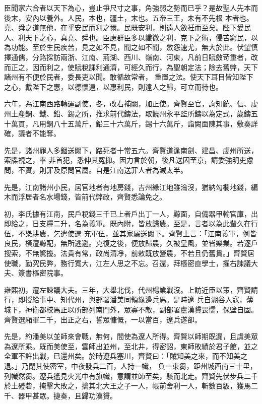 \begin{pinyinscope}
 臣聞家六合者以天下為心，豈止爭尺寸之事，角強弱之勢而已乎？是故聖人先本而後末，安內以養外。人民，本也，疆土，末也。五帝三王，未有不先根
 本者也。堯、舜之道無他，在乎安民而利之爾。民既安利，則遠人斂衽而至矣。陛下愛民人、利天下之心，真堯、舜也。臣慮群臣多以纖微之利，克下之術，侵苦窮民，以為功能。至於生民疾苦，見之如不見，聞之如不聞，斂怨速尤，無大於此。伏望慎擇通儒，分路採訪兩浙、江南、荊湖、西川、嶺南、河東，凡前日賦斂苛重者，改而正之，因而利之，使賦稅課利通濟，可經久而行，為聖朝定法；除去舊弊，天下諸州有不便於民者，委長吏以聞。敢循故常者，
 重置之法。使天下耳目皆知陛下之心，戴陛下之惠，以德懷遠，以惠利民，則遠人之歸，可立而待也。



 六年，為江南西路轉運副使，冬，改右補闕，加正使。齊賢至官，詢知饒、信、虔州土產銅、鐵、鉛、錫之所，推求前代鑄法，取饒州永平監所鑄以為定式，歲鑄五十萬貫，凡用銅八十五萬斤，鉛三十六萬斤，錫十六萬斤，詣闕面陳其事，敷奏詳確，議者不能奪。



 先是，諸州罪人多錮送闕下，路死者十常五六。齊賢道逢南劍、建昌、虔州所送，索牒視之，率
 非首犯，悉伸其冤抑。因力言於朝，後凡送囚至京，請委強明吏慮問，不實，則罪及原問官屬。自是江南送罪人者為減太半。



 先是，江南諸州小民，居官地者有地房錢，吉州緣江地雖淪沒，猶納勾欄地錢，編木而浮居者名水場錢，皆前代弊政，齊賢悉論免之。



 初，李氏據有江南，民戶稅錢三千已上者戶出丁一人，黥面，自備器甲輸官庫，出即給之，日支糧二升，名為義軍。既內附，皆放歸農。至是，言者以為此輩久在行伍，不樂耕農，乞遣使選
 充軍伍，並其家屬送闕下。齊賢上言：「江南義軍，例皆良民，橫遭黥配，無所逃避。克復之後，便放歸農，久被皇風，並皆樂業。若逐戶搜索，不無驚擾。法貴有常，政尚清凈，前敕既放營農，不若且仍舊貫。」齊賢居使職，勤究民弊，務行寬大，江左人思之不忘。召還，拜樞密直學士，擢右諫議大夫、簽書樞密院事。



 雍熙初，遷左諫議大夫。三年，大舉北伐，代州楊業戰沒。上訪近臣以策，齊賢請行，即授給事中、知代州，與部署潘美同領緣邊兵馬。是時遼
 兵自湖谷入寇，薄城下，神衛都校馬正以所部列南門外，眾寡不敵，副部署盧漢贇畏懦，保壁自固。齊賢選廂軍二千，出正之右，誓眾慷慨，一以當百，遼兵遂卻。



 先是，約潘美以並師來會戰，無何，間使為遼人所得。齊賢以師期既漏，且虞美眾為遼所乘。既而美使至，雲師出並州，至北井，得密詔，東師敗績於君子館，並之全軍不許出戰，已還州矣。於時遼兵塞川，齊賢曰：「賊知美之來，而不知美之退。」乃閉其使密室，中夜發兵二百，人持一幟，
 負一束芻，距州城西南三十里，列幟然芻。遼兵遙見火光中有旗幟，意謂並師至矣，駭而北走。齊賢先伏步兵二千於土磴砦，掩擊大敗之，擒其北大王之子一人，帳前舍利一人，斬數百級，獲馬二千、器甲甚眾。捷奏，且歸功漢贇。




\end{pinyinscope}
